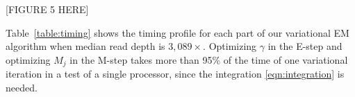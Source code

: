 \documentclass{bmcart}
\begin{document}
\vspace{2em}
\begin{center}
[FIGURE 5 HERE]  
\end{center}
\vspace{2em}


Table~\ref{table:timing} shows the timing profile for each part of our variational EM algorithm when median read depth is $3,089\times$.
Optimizing $\gamma$ in the E-step and optimizing $M_j$ in the M-step takes more than 95\% of the time of one variational iteration in a test of a single processor, since the integration \eqref{eqn:integration} is needed.
\end{document}
